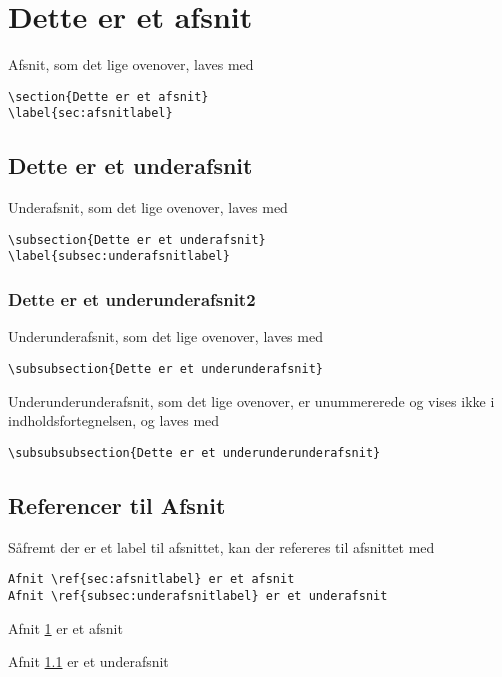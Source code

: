 \section{Dette er et afsnit}
\label{sec:afsnitlabel}
Afsnit, som det lige ovenover, laves med

\begin{verbatim}
\section{Dette er et afsnit}
\label{sec:afsnitlabel}
\end{verbatim}

\subsection{Dette er et underafsnit}
\label{subsec:underafsnitlabel}
Underafsnit, som det lige ovenover, laves med

\begin{verbatim}
\subsection{Dette er et underafsnit}
\label{subsec:underafsnitlabel}
\end{verbatim}

\subsubsection{Dette er et underunderafsnit2}
Underunderafsnit, som det lige ovenover, laves med

\begin{verbatim}
\subsubsection{Dette er et underunderafsnit}
\end{verbatim}

Underunderunderafsnit, som det lige ovenover, er unummererede og vises ikke i indholdsfortegnelsen, og laves med

\begin{verbatim}
\subsubsubsection{Dette er et underunderunderafsnit}
\end{verbatim}

\subsection{Referencer til Afsnit}
Såfremt der er et label til afsnittet, kan der refereres til afsnittet med

\begin{verbatim}
Afnit \ref{sec:afsnitlabel} er et afsnit
Afnit \ref{subsec:underafsnitlabel} er et underafsnit
\end{verbatim}

Afnit \ref{sec:afsnitlabel} er et afsnit

Afnit \ref{subsec:underafsnitlabel} er et underafsnit